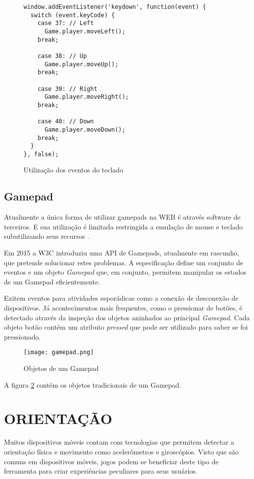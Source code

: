 \begin{figure}[H]
\centering
\begin{verbatim}
window.addEventListener('keydown', function(event) {
  switch (event.keyCode) {
    case 37: // Left
      Game.player.moveLeft();
    break;

    case 38: // Up
      Game.player.moveUp();
    break;

    case 39: // Right
      Game.player.moveRight();
    break;

    case 40: // Down
      Game.player.moveDown();
    break;
  }
}, false);
\end{verbatim}
\caption{Utilização dos eventos do teclado}
\label{fig:keyboardEvents}
\end{figure}

\subsection{Gamepad}

Atualmente a única forma de utilizar gamepads na WEB é
através software de terceiros. E sua utilização é limitada
restringida a emulação de mouse e teclado subutilizando seus
recursos \autocite{gamepad}.

Em 2015 a W3C introduziu uma API de Gamepads, atualmente em rascunho,
que pretende solucionar estes problemas. A especificação define um
conjunto de eventos e um objeto \textit{Gamepad} que, em conjunto,
permitem manipular os estados de um Gamepad eficientemente.

Exitem eventos para atividades esporádicas como a conexão de
desconexão de dispositivos. Já acontecimentos mais frequentes, como o
pressionar de botões, é detectado através da inspeção dos objetos
aninhados ao principal \textit{Gamepad}. Cada objeto botão contém um 
atributo \textit{pressed} que pode ser utilizado para saber se foi pressionado.

\begin{figure}[H]
    \centering
    \texttt{[image: gamepad.png]}
    \caption{Objetos de um Gamepad}
    \label{fig:gamepad}
\end{figure}

A figura \ref{fig:gamepad} contém os objetos tradicionais de um Gamepad.

\section{ORIENTAÇÃO}
Muitos dispositivos móveis contam com tecnologias que permitem detectar
a orientação física e movimento como acelerômetros e giroscópios.
Visto que são comuns em dispositivos móveis, jogos podem se beneficiar
deste tipo de ferramenta para criar experiências peculiares para seus
usuários.

